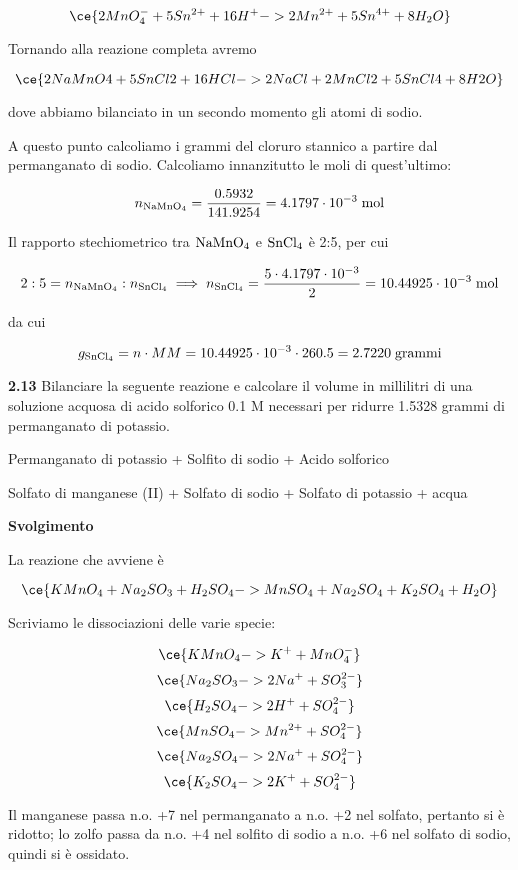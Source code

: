 $$\ce{2MnO_4^- + 5Sn^{2+} + 16H^+ -> 2Mn^{2+} + 5Sn^{4+} + 8H_2O}$$

Tornando alla reazione completa avremo

$$\ce{2NaMnO4 + 5SnCl2 + 16HCl -> 2NaCl + 2MnCl2 + 5SnCl4 + 8H2O}$$

dove abbiamo bilanciato in un secondo momento gli atomi di sodio.

A questo punto calcoliamo i grammi del cloruro stannico a partire dal permanganato di sodio. Calcoliamo innanzitutto le moli di quest'ultimo:

$$n_{\rm NaMnO_4}=\frac{0.5932}{141.9254}
=4.1797 \cdot 10^{-3} \; \rm mol$$

Il rapporto stechiometrico tra $\rm NaMnO_4$ e $\rm SnCl_4$ è 2:5, per cui 

$$2:5=n_{\rm NaMnO_4}:n_{\rm SnCl_4}
\implies
n_{\rm SnCl_4}=\frac{5 \cdot 4.1797 \cdot 10^{-3}}{2}
=10.44925 \cdot 10^{-3} \; \rm mol$$

da cui

$$g_{\rm SnCl_4}=n \cdot MM=10.44925 \cdot 10^{-3} \cdot 260.5=2.7220 \; \rm grammi$$

\vspace{0.2cm}\textbf{2.13} Bilanciare la seguente reazione e calcolare il volume in millilitri di una soluzione acquosa di acido solforico 0.1 M necessari per ridurre 1.5328 grammi di permanganato di potassio.

\begin{center}
    Permanganato di potassio + Solfito di sodio + Acido solforico \ce{->}

    \ce{->} Solfato di manganese (II) + Solfato di sodio + Solfato di potassio + acqua
\end{center}

\large\textbf{Svolgimento}\normalsize

\vspace{0.2cm}La reazione che avviene è

$$\ce{KMnO_4 + Na_2SO_3 + H_2SO_4 -> MnSO_4 + Na_2SO_4 + K_2SO_4 + H_2O}$$

Scriviamo le dissociazioni delle varie specie:

$$\ce{KMnO_4 -> K^+ + MnO_4^-}$$
$$\ce{Na_2SO_3 -> 2Na^+ + SO_3^{2-}}$$
$$\ce{H_2SO_4 -> 2H^+ + SO_4^{2-}}$$
$$\ce{MnSO_4 -> Mn^{2+} + SO_4^{2-}}$$
$$\ce{Na_2SO_4 -> 2Na^+ + SO_4^{2-}}$$
$$\ce{K_2SO_4 -> 2K^+ + SO_4^{2-}}$$

Il manganese passa n.o. +7 nel permanganato a n.o. +2 nel solfato, pertanto si è ridotto; lo zolfo passa da n.o. +4 nel solfito di sodio a n.o. +6 nel solfato di sodio, quindi si è ossidato.


